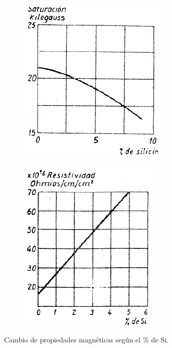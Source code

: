 \documentclass[12pt,a4paper]{article}
\begin{document}
\begin{figure}[h!]
    \centering
    \begin{subfigure}{0.45\textwidth}
        \includegraphics[width=\textwidth]{IMAGENES LATEX/silicio_2.png}
        \label{fig:silicio2}
    \end{subfigure}
    \begin{subfigure}{0.45\textwidth}
        \includegraphics{IMAGENES LATEX/silicio_1.png}
        \label{fig:silicio1}
    \end{subfigure}
    \caption{Cambio de propiedades magnéticas según el \% de Si.}
\end{figure}
\end{document}
